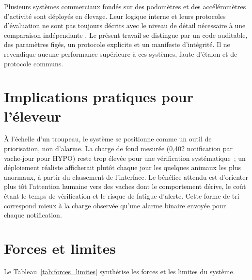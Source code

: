 Plusieurs systèmes commerciaux fondés sur des podomètres et des accéléromètres d'activité
sont déployés en élevage. Leur logique interne et leurs protocoles d'évaluation ne sont pas
toujours décrits avec le niveau de détail nécessaire à une comparaison indépendante
\citep{rutten2013invited,stangaferro2016use}. Le présent travail se distingue par un code
auditable, des paramètres figés, un protocole explicite et un manifeste d'intégrité. Il ne
revendique aucune performance supérieure à ces systèmes, faute d'étalon et de protocole
communs.

\section{Implications pratiques pour l'éleveur}

À l'échelle d'un troupeau, le système se positionne comme un outil de priorisation, non
d'alarme. La charge de fond mesurée (0,402 notification par vache-jour pour HYPO) reste trop
élevée pour une vérification systématique~; un déploiement réaliste afficherait plutôt chaque
jour les quelques animaux les plus anormaux, à partir du classement de l'interface. Le
bénéfice attendu est d'orienter plus tôt l'attention humaine vers des vaches dont le
comportement dérive, le coût étant le temps de vérification et le risque de fatigue d'alerte.
Cette forme de tri correspond mieux à la charge observée qu'une alarme binaire envoyée pour
chaque notification.

\section{Forces et limites}

Le Tableau~\ref{tab:forces_limites} synthétise les forces et les limites du système.

